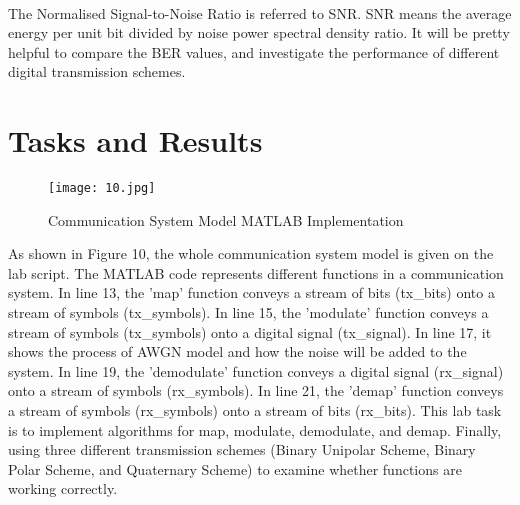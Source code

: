 \documentclass[12pt]{article}
\begin{document}
    \paragraph{}
    The Normalised Signal-to-Noise Ratio is referred to SNR. SNR means the average energy per unit bit divided by noise power spectral density ratio. It will be pretty helpful to compare the BER values, and investigate the performance of different digital transmission schemes\cite{7}.
    
    
    
    
    
    
    \section{Tasks and Results}
    \paragraph{}
    \begin{figure}[H]
    \centering
    \texttt{[image: 10.jpg]}
    \caption{Communication System Model MATLAB Implementation}
    \end{figure}
    As shown in Figure 10, the whole communication system model is given on the lab script. The MATLAB code represents different functions in a communication system. In line 13, the 'map' function conveys a stream of bits (tx\_bits) onto a stream of symbols (tx\_symbols). In line 15, the 'modulate' function conveys a stream of symbols (tx\_symbols) onto a digital signal (tx\_signal). In line 17, it shows the process of AWGN model and how the noise will be added to the system. In line 19, the 'demodulate' function conveys a digital signal (rx\_signal) onto a stream of symbols (rx\_symbols). In line 21, the 'demap' function conveys a stream of symbols (rx\_symbols) onto a stream of bits (rx\_bits). This lab task is to implement algorithms for map, modulate, demodulate, and demap. Finally, using three different transmission schemes (Binary Unipolar Scheme, Binary Polar Scheme, and Quaternary Scheme) to examine whether functions are working correctly. 
    
    
    
    
    
    
    
    
    
    
    
    
    
    
    
    
    
\end{document}
